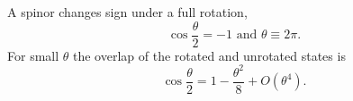 \documentclass{article}
\begin{document}
A spinor changes sign under a full rotation,
\begin{equation}
\cos\frac{\theta}{2} = -1 \text{ and } \theta \equiv 2\pi .
\label{eq:full}
\end{equation}
For small $\theta$ the overlap of the rotated and unrotated states is
\begin{equation}
\cos\frac{\theta}{2} = 1 - \frac{\theta^2}{8} + O(\theta^4) .
\label{eq:small}
\end{equation}
\end{document}
